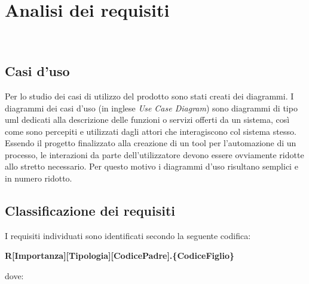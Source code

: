 
\chapter{Analisi dei requisiti}
\label{cap:analisi-requisiti}

\\


\section{Casi d'uso}

Per lo studio dei casi di utilizzo del prodotto sono stati creati dei diagrammi.
I diagrammi dei casi d'uso (in inglese \emph{Use Case Diagram}) sono diagrammi di tipo \gls{uml} dedicati alla descrizione delle funzioni o servizi offerti da un sistema, così come sono percepiti e utilizzati dagli attori che interagiscono col sistema stesso.
Essendo il progetto finalizzato alla creazione di un tool per l'automazione di un processo, le interazioni da parte dell'utilizzatore devono essere ovviamente ridotte allo stretto necessario. Per questo motivo i diagrammi d'uso risultano semplici e in numero ridotto.

\section{Classificazione dei requisiti}
I requisiti individuati sono identificati secondo la seguente codifica:
\begin{center}
\textbf{R[Importanza][Tipologia][CodicePadre].\{CodiceFiglio\}}\\
\end{center}
dove:



